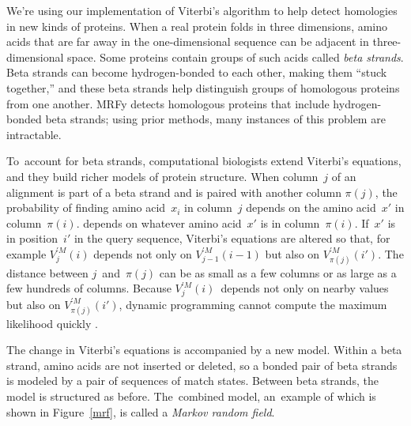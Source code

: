 \documentclass[preprint,nonatbib,blockstyle,times]{sigplanconf}
\newcommand\pairedwith[1]{{\pi(#1)}}
\newcommand\figref[1]{Figure~\ref{#1}}
\newcommand\seclabel[1]{\label{sec:#1}}
\let\cite\citep
\begin{document}
\seclabel{hofs}
\seclabel{mrfy}

We're using our implementation of Viterbi's algorithm to help detect
homologies in new kinds of proteins.
When a real protein folds in three dimensions, 
amino acids 
that are far away in the one-dimensional sequence can be
adjacent in three-dimensional space.
Some proteins contain groups of such acids called \emph{beta
strands}.
Beta strands
can become hydrogen-bonded to each other,
making them ``stuck together,''
and these beta strands help distinguish groups of homologous
proteins from one another.
MRFy detects homologous proteins that include hydrogen-bonded beta
strands; using prior methods, many instances of this problem are
intractable. 

To~account for beta strands, computational biologists extend
Viterbi's equations, and they build
richer models of protein structure.
When column~$j$ of an alignment is part of a beta strand and is paired
with another column  $\pairedwith j$,
the probability of finding amino acid~$x_i$ in column~$j$ 
\ifpagetuning
depends on the amino acid~$x'$ in column~${\pairedwith i}$.
\else
depends on whatever amino acid~$x'$  is in column~${\pairedwith i}$.
\fi
If~$x'$ is in position~$i'$ in the query sequence, Viterbi's
equations are altered so that, for example
$V_{j}^{\prime M}(i)$ depends not only on
$V_{j-1}^{\prime M}(i-1)$ but also on
$V_{\pairedwith j}^{\prime M}(i')$.
The distance between $j$~and~$\pairedwith j$ can be as small as a few
columns or as large as a few hundreds of columns.
Because $V_j^{\prime M}(i)$~depends not only on nearby values but also on
$V_{\pairedwith j}^{\prime M}(i')$,
dynamic programming cannot compute the maximum likelihood quickly 
\cite{Menke:2010ti,Daniels:2012}.

The change in Viterbi's equations is accompanied by a new model.
Within a beta strand, amino acids are not inserted or deleted, so
a bonded pair of beta strands is modeled by
 a pair of sequences of match states.
Between beta strands, the model is structured as before.
The~combined model, an~example of which is shown in \figref{mrf}, is called a
\textit{Markov random field}. 
\end{document}
